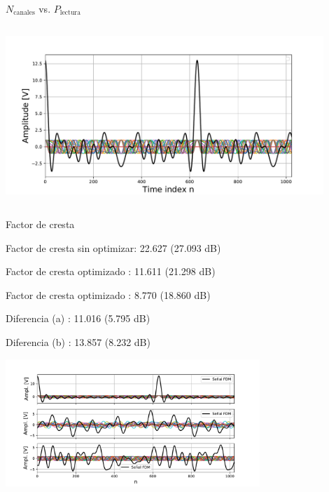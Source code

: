 \documentclass[ignorenonframetext,12pt]{beamer}
\begin{document}
\begin{frame}{$N_\text{canales}$ vs. $P_\text{lectura}$}
\begin{columns}
\begin{column}{0.6\textwidth}
												\includegraphics[width=0.9\textwidth]{in_spectrum_time}
								\end{column}
				\end{columns}
\end{frame}

\begin{frame}{Factor de cresta}

				Factor de cresta sin optimizar: 22.627 (27.093 dB)

				Factor de cresta optimizado   : 11.611 (21.298 dB)

				Factor de cresta optimizado   : 8.770 (18.860 dB)

				Diferencia (a)                : 11.016 (5.795 dB)

				Diferencia (b)                : 13.857 (8.232 dB)


				\centering
												\includegraphics[width=0.72\textwidth]{in_spectrum_time2}
\end{frame}
\end{document}
